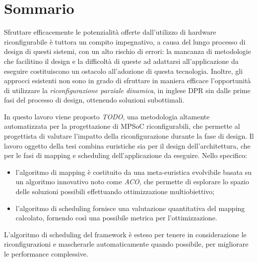 \chapter*{Sommario}
\vspace{0.5cm}
Sfruttare efficacemente le potenzialit\`a offerte dall'utilizzo di hardware riconfigurabile
\`e tuttora un compito impegnativo, a causa del lungo processo di design di questi sistemi,
con un alto rischio di errori: la mancanza di metodologie che facilitino il design e
la difficolt\`a di queste ad adattarsi all'applicazione da eseguire costituiscono
un ostacolo all'adozione di questa tecnologia.
Inoltre, gli approcci esistenti non sono in grado di sfruttare in maniera efficace
l'opportunit\`a di utilizzare la \emph{riconfigurazione parziale dinamica}, in inglese
\ac{DPR} sin dalle prime fasi del processo di design, ottenendo soluzioni subottimali.

In questo lavoro viene proposto \emph{TODO}, una metodologia
altamente automatizzata per la progettazione di \acs{MPSoC} riconfigurabili, che permette
al progettista di valutare l'impatto della riconfigurazione durante la fase di design.
Il lavoro oggetto della tesi combina euristiche sia per il design dell'architettura, che per
le fasi di mapping e scheduling dell'applicazione da eseguire.
Nello specifico:
\begin{itemize}
  \item l'algoritmo di mapping \`e costituito da una meta-euristica evolvibile basata su un
    algoritmo innovativo noto come \emph{\ac{ACO}}, che permette di esplorare lo spazio delle
    soluzioni possibili effettuando ottimizzazione multiobiettivo;
  \item l'algoritmo di scheduling fornisce una valutazione quantitativa del mapping calcolato,
    fornendo cos\`i una possibile metrica per l'ottimizzazione.
\end{itemize}
L'algoritmo di scheduling del framework \`e esteso per tenere in considerazione
le riconfigurazioni e mascherarle automaticamente quando possibile, per migliorare le
performance complessive.

